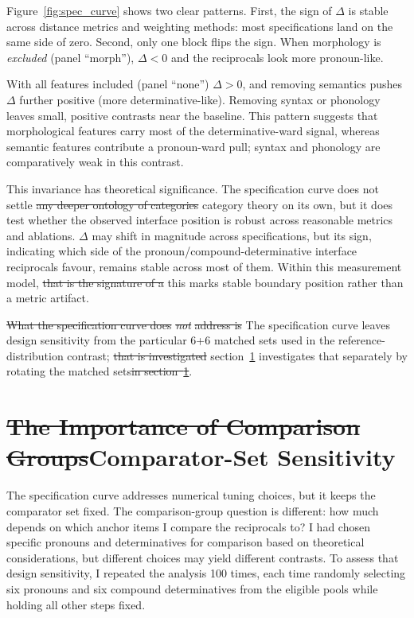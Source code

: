 \documentclass[12pt]{article}
\providecommand{\DIFaddtex}[1]{{\protect\color{DIFgreen}#1}} %
\providecommand{\DIFdeltex}[1]{{\protect\color{red}\sout{#1}}}                      %
\providecommand{\DIFaddbegin}{} %
\providecommand{\DIFaddend}{} %
\providecommand{\DIFdelbegin}{} %
\providecommand{\DIFdelend}{} %
\providecommand{\DIFadd}[1]{\texorpdfstring{\DIFaddtex{#1}}{#1}} %
\providecommand{\DIFdel}[1]{\texorpdfstring{\DIFdeltex{#1}}{}} %
\newcommand{\DIFscaledelfig}{0.5}
\newlength{\DIFdelgraphicswidth} %
\newlength{\DIFdelgraphicsheight} %
\newcommand{\DIFaddincludegraphics}[2][]{{\color{DIFgreen}\fbox{\DIFOincludegraphics[#1]{#2}}}} %
\newcommand{\DIFdelincludegraphics}[2][]{%
\sbox{\DIFdelgraphicsbox}{\DIFOincludegraphics[#1]{#2}}%
\settoboxwidth{\DIFdelgraphicswidth}{\DIFdelgraphicsbox} %
\settoboxtotalheight{\DIFdelgraphicsheight}{\DIFdelgraphicsbox} %
\scalebox{\DIFscaledelfig}{%
\parbox[b]{\DIFdelgraphicswidth}{\usebox{\DIFdelgraphicsbox}\\[-\baselineskip] \rule{\DIFdelgraphicswidth}{0em}}\llap{\resizebox{\DIFdelgraphicswidth}{\DIFdelgraphicsheight}{%
\setlength{\unitlength}{\DIFdelgraphicswidth}%
\begin{picture}(1,1)%
\thicklines\linethickness{2pt} %
{\color[rgb]{1,0,0}\put(0,0){\framebox(1,1){}}}%
{\color[rgb]{1,0,0}\put(0,0){\line( 1,1){1}}}%
{\color[rgb]{1,0,0}\put(0,1){\line(1,-1){1}}}%
\end{picture}%
}\hspace*{3pt}}} %
} %
\DeclareRobustCommand{\DIFaddbegin}{\DIFOaddbegin \let\includegraphics\DIFaddincludegraphics} %
\DeclareRobustCommand{\DIFaddend}{\DIFOaddend \let\includegraphics\DIFOincludegraphics} %
\DeclareRobustCommand{\DIFdelbegin}{\DIFOdelbegin \let\includegraphics\DIFdelincludegraphics} %
\DeclareRobustCommand{\DIFdelend}{\DIFOaddend \let\includegraphics\DIFOincludegraphics} %
\begin{document}
Figure~\ref{fig:spec_curve} shows two clear patterns. First, the sign of \(\Delta\) is stable across distance metrics and weighting methods: most specifications land on the same side of zero. Second, only one block flips the sign. When morphology is \emph{excluded} (panel \enquote{morph}), \(\Delta<0\) and the reciprocals look more pronoun-like.

With all features included (panel \enquote{none}) \(\Delta>0\), and removing semantics pushes \(\Delta\) further positive (more determinative-like). Removing syntax or phonology leaves small, positive contrasts near the baseline. This pattern suggests that morphological features carry most of the determinative-ward signal, whereas semantic features contribute a pronoun-ward pull; syntax and phonology are comparatively weak in this contrast.

This invariance has theoretical significance. The specification curve does not settle \DIFdelbegin \DIFdel{any deeper ontology of categories }\DIFdelend \DIFaddbegin \DIFadd{category theory }\DIFaddend on its own, but it does test whether the observed interface position is robust across reasonable metrics and ablations. $\Delta$ may shift in magnitude across specifications, but its sign, indicating which side of the pronoun/compound-determinative interface reciprocals favour, remains stable across most of them. Within this measurement model, \DIFdelbegin \DIFdel{that is the signature of a }\DIFdelend \DIFaddbegin \DIFadd{this marks }\DIFaddend stable boundary position rather than a metric artifact.

\DIFdelbegin \DIFdel{What the specification curve does }\emph{\DIFdel{not}} %
\DIFdel{address is }\DIFdelend \DIFaddbegin \DIFadd{The specification curve leaves }\DIFaddend design sensitivity from the particular 6+6 matched sets used in the reference-distribution contrast; \DIFdelbegin \DIFdel{that is investigated }\DIFdelend \DIFaddbegin \DIFadd{section~\ref{sec:rotations} investigates that }\DIFaddend separately by rotating the matched sets\DIFdelbegin \DIFdel{in section~\ref{sec:rotations}}\DIFdelend .

\section{\DIFdelbegin \DIFdel{The Importance of Comparison Groups}\DIFdelend \DIFaddbegin \DIFadd{Comparator-Set Sensitivity}\DIFaddend }
\label{sec:rotations}

The specification curve addresses numerical tuning choices, but it keeps the comparator set fixed. The comparison-group question is different: how much depends on which anchor items I compare the reciprocals to? I had chosen specific pronouns and determinatives for comparison based on theoretical considerations, but different choices may yield different contrasts. To assess that design sensitivity, I repeated the analysis 100 times, each time randomly selecting six pronouns and six compound determinatives from the eligible pools while holding all other steps fixed.
\end{document}
